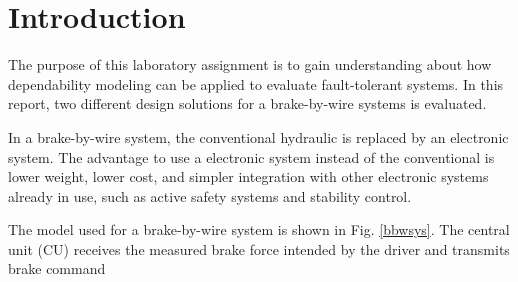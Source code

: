 \newpage
\section{Introduction}

The purpose of this laboratory assignment is to gain understanding about how dependability modeling can be applied to evaluate fault-tolerant systems. In this report, two different design solutions for a brake-by-wire systems is evaluated.
 
In a brake-by-wire system, the conventional hydraulic is replaced by an electronic system. The advantage to use a electronic system instead of the conventional is lower weight, lower cost, and simpler integration with other electronic systems already in use, such as active safety systems and stability control. 

The model used for a brake-by-wire system is shown in Fig. \ref{bbwsys}. The central unit (CU) receives the measured brake force intended by the driver and transmits brake command 



